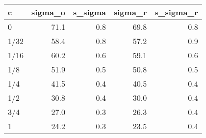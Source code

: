 \begin{tabular}{lrrrr}
\toprule
   c &  sigma\_o &  s\_sigma &  sigma\_r &  s\_sigma\_r \\
\midrule
   0 &     71.1 &      0.8 &     69.8 &        0.8 \\
1/32 &     58.4 &      0.8 &     57.2 &        0.9 \\
1/16 &     60.2 &      0.6 &     59.1 &        0.6 \\
 1/8 &     51.9 &      0.5 &     50.8 &        0.5 \\
 1/4 &     41.5 &      0.4 &     40.5 &        0.4 \\
 1/2 &     30.8 &      0.4 &     30.0 &        0.4 \\
 3/4 &     27.0 &      0.3 &     26.3 &        0.4 \\
   1 &     24.2 &      0.3 &     23.5 &        0.4 \\
\bottomrule
\end{tabular}
